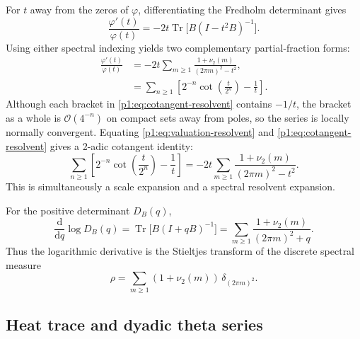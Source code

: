 \documentclass[11pt,oneside]{article}
\theoremstyle{definition}
\newcommand{\Tr}{\operatorname{Tr}}
\newcommand{\vtwo}{\nu_2}
\newcommand{\bigO}{\mathcal O}
\newcommand{\phiF}{\varphi}
\begin{document}
For \(t\) away from the zeros of \(\phiF\), differentiating the Fredholm determinant
gives
\begin{equation}
 \frac{\phiF'(t)}{\phiF(t)}
 =-2t\Tr\bigl[B(I-t^2B)^{-1}\bigr].
 \label{p1:eq:resolvent-logderivative}
\end{equation}
Using either spectral indexing yields two complementary partial-fraction forms:
\begin{align}
 \frac{\phiF'(t)}{\phiF(t)}
 &=-2t\sum_{m\ge1}\frac{1+\vtwo(m)}{(2\pi m)^2-t^2},
 \label{p1:eq:valuation-resolvent}\\
 &=\sum_{n\ge1}
 \left[2^{-n}\cot\!\left(\frac{t}{2^n}\right)-\frac1t\right].
 \label{p1:eq:cotangent-resolvent}
\end{align}
Although each bracket in \eqref{p1:eq:cotangent-resolvent} contains \(-1/t\), the bracket
as a whole is \(\bigO(4^{-n})\) on compact sets away from poles, so the series is
locally normally convergent.  Equating \eqref{p1:eq:valuation-resolvent} and
\eqref{p1:eq:cotangent-resolvent} gives a 2-adic cotangent identity:
\begin{equation}
 \sum_{n\ge1}
 \left[2^{-n}\cot\!\left(\frac{t}{2^n}\right)-\frac1t\right]
 =-2t\sum_{m\ge1}\frac{1+\vtwo(m)}{(2\pi m)^2-t^2}.
 \label{p1:eq:cot-valuation-identity}
\end{equation}
This is simultaneously a scale expansion and a spectral resolvent expansion.

For the positive determinant \(D_B(q)\),
\begin{equation}
 \frac{\mathrm d}{\mathrm dq}\log D_B(q)
 =\Tr\bigl[B(I+qB)^{-1}\bigr]
 =\sum_{m\ge1}\frac{1+\vtwo(m)}{(2\pi m)^2+q}.
 \label{p1:eq:Stieltjes-resolvent}
\end{equation}
Thus the logarithmic derivative is the Stieltjes transform of the discrete spectral
measure
\begin{equation}
 \rho=\sum_{m\ge1}(1+\vtwo(m))\,\delta_{(2\pi m)^2}.
 \label{p1:eq:spectral-measure}
\end{equation}

\subsection{Heat trace and dyadic theta series}
\end{document}
